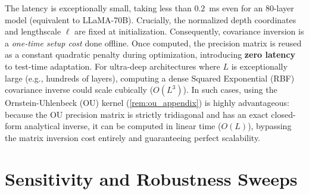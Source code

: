 \documentclass{article}
\theoremstyle{plain}
\theoremstyle{definition}
\theoremstyle{remark}
\begin{document}
\begin{table}[h]
\caption{\textbf{GP Covariance Matrix Inversion Latency.} We report the average inversion latency in milliseconds across 1,000 iterations for various network depths $L$ on an Intel(R) Xeon(R) Platinum 8275CL CPU @ 3.00GHz.}
\label{tab:latency}
\vskip 0.1in
\begin{center}
\begin{small}
\end{small}
\end{center}
\vskip -0.1in
\end{table}

The latency is exceptionally small, taking less than $0.2$~ms even for an $80$-layer model (equivalent to LLaMA-70B). Crucially, the normalized depth coordinates and lengthscale $\ell$ are fixed at initialization. Consequently, covariance inversion is a \emph{one-time setup cost} done offline. Once computed, the precision matrix is reused as a constant quadratic penalty during optimization, introducing \textbf{zero latency} to test-time adaptation. For ultra-deep architectures where $L$ is exceptionally large (e.g., hundreds of layers), computing a dense Squared Exponential (RBF) covariance inverse could scale cubically ($O(L^3)$). In such cases, using the Ornstein-Uhlenbeck (OU) kernel (\cref{rem:ou_appendix}) is highly advantageous: because the OU precision matrix is strictly tridiagonal and has an exact closed-form analytical inverse, it can be computed in linear time ($O(L)$), bypassing the matrix inversion cost entirely and guaranteeing perfect scalability.

\section{Sensitivity and Robustness Sweeps}
\label{sec:appendix_sweeps}
\end{document}
